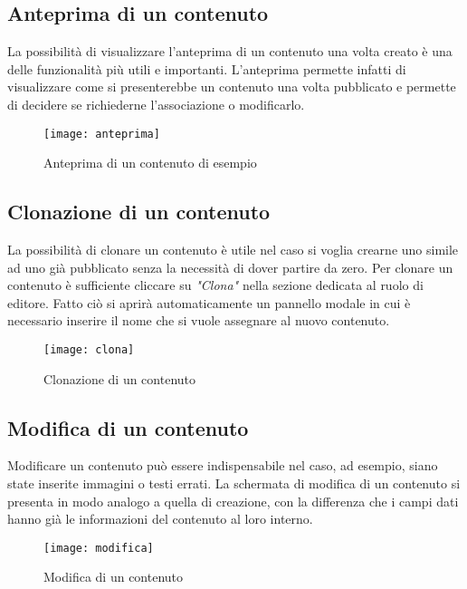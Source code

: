 \subsection{Anteprima di un contenuto}
La possibilità di visualizzare l'anteprima di un contenuto una volta creato è una delle funzionalità più utili e importanti. L'anteprima permette infatti di visualizzare come si presenterebbe un contenuto una volta pubblicato e permette di decidere se richiederne l'associazione o modificarlo.
\begin{figure}[h]
    \begin{center}
    \texttt{[image: anteprima]}
    \caption{Anteprima di un contenuto di esempio}
    \label{fig:figure25}
    \end{center}
\end{figure}

\subsection{Clonazione di un contenuto}
La possibilità di clonare un contenuto è utile nel caso si voglia crearne uno simile ad uno già pubblicato senza la necessità di dover partire da zero. Per clonare un contenuto è sufficiente cliccare su \textit{"Clona"} nella sezione dedicata al ruolo di editore. Fatto ciò si aprirà automaticamente un pannello modale in cui è necessario inserire il nome che si vuole assegnare al nuovo contenuto.
\begin{figure}[h]
    \begin{center}
    \texttt{[image: clona]}
    \caption{Clonazione di un contenuto}
    \label{fig:figure26}
    \end{center}
\end{figure}

\subsection{Modifica di un contenuto}
Modificare un contenuto può essere indispensabile nel caso, ad esempio, siano state inserite immagini o testi errati. La schermata di modifica di un contenuto si presenta in modo analogo a quella di creazione, con la differenza che i campi dati hanno già le informazioni del contenuto al loro interno.
\begin{figure}[h]
    \begin{center}
    \texttt{[image: modifica]}
    \caption{Modifica di un contenuto}
    \label{fig:figure27}
    \end{center}
\end{figure}
\newpage
